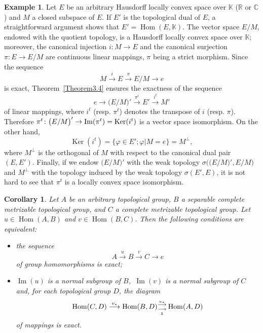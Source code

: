 \documentclass[12pt]{amsart}
\theoremstyle{theorem}
\newtheorem{corollary}[theorem]{Corollary}
\theoremstyle{definition}
\newtheorem{example}[theorem]{Example}
\theoremstyle{remark} \theoremstyle{question} \theoremstyle{example}
\def\Hom{\operatorname{{Hom}}}
\def\Ker{\operatorname{{Ker}}}
\def\mI{\operatorname{{Im}}}
\begin{document}
\begin{example}\label{Example3.5}
Let $E$ be an arbitrary Hausdorff locally convex space over $\mathbb{K}$
($\mathbb R$ or $\mathbb C$) and $M$ a closed subspace of $E$. If $E'$ is
the topological dual of $E$, a straightforward argument shows that
$E' = \Hom(E,\mathbb K)$. The vector space $E/M$, endowed with the quotient
topology, is a Hausdorff locally convex space over $\mathbb K$; moreover,
the canonical injection $i\colon M \to E$ and the canonical surjection
$\pi\colon E \to E/M$ are continuous linear mappings, $\pi$ being a strict
morphism. Since the sequence
$$
M \overset{i}{\longrightarrow} E \overset{\pi}{\longrightarrow} E/M \longrightarrow e
$$
is exact, Theorem~\ref{Theorem3.4} ensures the exactness of the sequence
$$
e \longrightarrow \big(E/M\big)' \overset{\pi^t}{\longrightarrow} E' \overset{i^t}{\longrightarrow} M'
$$
of linear mappings, where $i^t$ (resp. $\pi^t$) denotes the transpose of $i$
(resp. $\pi$). Therefore $\pi^t\colon \big(E/M\big)' \to {\rm Im}(\pi^t) =
{\rm Ker}(i^t)$ is a vector space isomorphism. On the other hand,
$$
\Ker(i^t) = \{\varphi \in E'; \varphi|M = e\} = M^{\bot},
$$
where $M^\bot$ is the orthogonal of $M$ with respect to the canonical dual
pair $(E,E')$. Finally, if we endow $\big(E/M\big)'$ with the weak topology
$\sigma\big(\big(E/M\big)', E/M\big)$ and $M^\bot$ with the topology induced
by the weak topology $\sigma(E',E)$, it is not hard to see that $\pi^t$ is a
locally convex space isomorphism.
\end{example}

\begin{corollary}\label{Corollary3.6}
Let $A$ be an arbitrary topological group, $B$ a 
separable complete metrizable topological group, and $C$ a complete metrizable topological
group. Let $u \in \Hom(A,B)$ and $v \in \Hom(B,C)$. Then the following
conditions are equivalent:

\begin{itemize}

\item[\rm (a)] the sequence
  $$
  A \overset{u}{\longrightarrow} B \overset{v}{\longrightarrow} C \longrightarrow e
  $$
  of group homomorphisms is exact;

\item[\rm (b)] $\mI(u)$ is a normal subgroup of $B$,\, $\mI(v)$ is a normal
  subgroup of $C$ and, for each topological group $D$, the diagram
  $$
  \Hom(C,D) \overset{v_*}{\longrightarrow} \Hom(B,D){}^{\overset{u_*}{\longrightarrow}}_{\underset{\bf 1}{\longrightarrow}} \Hom(A,D)
  $$
  of mappings is exact.

\end{itemize}
\end{corollary}
\end{document}
